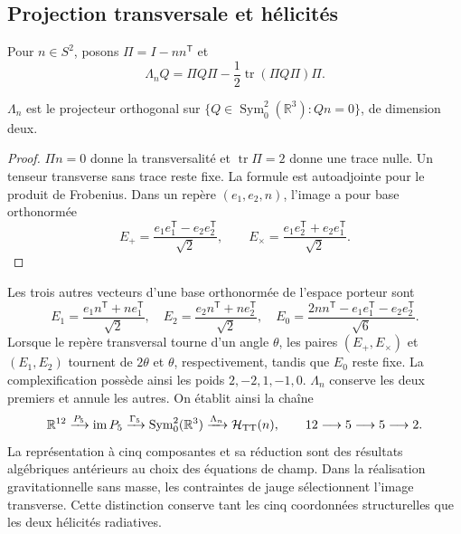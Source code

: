 \subsection{Projection transversale et hélicités}
Pour \(n\in S^2\), posons \(\Pi=I-nn^{\mathsf T}\) et
\[
 \Lambda_nQ=\Pi Q\Pi-\frac12\operatorname{tr}(\Pi Q\Pi)\Pi.
\]
\begin{proposition}
\(\Lambda_n\) est le projecteur orthogonal sur \(\{Q\in\operatorname{Sym}^2_0(\mathbb R^3):Qn=0\}\), de dimension deux.
\end{proposition}
\begin{proof}
\(\Pi n=0\) donne la transversalité et \(\operatorname{tr}\Pi=2\) donne
une trace nulle. Un tenseur transverse sans trace reste fixe.
La formule est autoadjointe pour le produit de Frobenius.
Dans un repère \((e_1,e_2,n)\), l'image a pour base orthonormée
\[
 E_+=\frac{e_1e_1^{\mathsf T}-e_2e_2^{\mathsf T}}{\sqrt2},\qquad
 E_\times=\frac{e_1e_2^{\mathsf T}+e_2e_1^{\mathsf T}}{\sqrt2}.
\]
\end{proof}
Les trois autres vecteurs d'une base orthonormée de l'espace porteur sont
\[
 E_1=\frac{e_1n^{\mathsf T}+ne_1^{\mathsf T}}{\sqrt2},\quad
 E_2=\frac{e_2n^{\mathsf T}+ne_2^{\mathsf T}}{\sqrt2},\quad
 E_0=\frac{2nn^{\mathsf T}-e_1e_1^{\mathsf T}-e_2e_2^{\mathsf T}}{\sqrt6}.
\]
Lorsque le repère transversal tourne d'un angle \(\theta\), les paires \((E_+,E_\times)\) et \((E_1,E_2)\) tournent de \(2\theta\) et \(\theta\), respectivement, tandis que \(E_0\) reste fixe. La complexification possède ainsi les poids \(2,-2,1,-1,0\). \(\Lambda_n\) conserve les deux premiers et annule les autres. On établit ainsi la chaîne
\[
 \mathbb R^{12}\xrightarrow{P_5}\operatorname{im}P_5
 \xrightarrow{\Gamma_5}\operatorname{Sym}^2_0(\mathbb R^3)
 \xrightarrow{\Lambda_n}\mathcal H_{\rm TT}(n),
 \qquad 12\longrightarrow5\longrightarrow5\longrightarrow2.
\]
La représentation à cinq composantes et sa réduction sont des résultats
algébriques antérieurs au choix des équations de champ.
Dans la réalisation gravitationnelle sans masse, les contraintes de jauge
sélectionnent l'image transverse. Cette distinction conserve tant les
cinq coordonnées structurelles que les deux hélicités radiatives.

